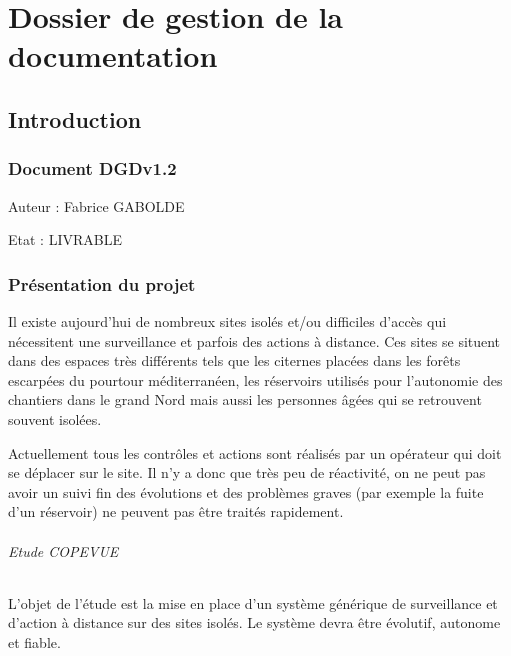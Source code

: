 

\renewcommand\docname{DGDv1.2}
\renewcommand\docauthor{Fabrice GABOLDE}
\renewcommand\docstatus{LIVRABLE}
\part{Dossier de gestion de la documentation}

\label{part:dgd}

\chapter{Introduction}

\section*{Document \docname{}}

Auteur : \docauthor{}

Etat : \docstatus{}

\section{Présentation du projet}

Il existe aujourd'hui de nombreux sites isolés et/ou difficiles d'accès qui nécessitent une surveillance et parfois des actions à distance. Ces sites se situent dans des espaces très différents tels que les citernes placées dans les forêts escarpées du pourtour méditerranéen, les réservoirs utilisés pour l'autonomie des chantiers dans le grand Nord mais aussi les personnes âgées qui se retrouvent souvent isolées.

Actuellement tous les contrôles et actions sont réalisés par un opérateur qui doit se déplacer sur le site. Il n'y a donc que très peu de réactivité, on ne peut pas avoir un suivi fin des évolutions et des problèmes graves (par exemple la fuite d'un réservoir) ne peuvent pas être traités rapidement.

\paragraph{Etude COPEVUE}
L'objet de l'étude est la mise en place d'un système générique de surveillance et d'action à distance sur des sites isolés. Le système devra être évolutif, autonome et fiable.

